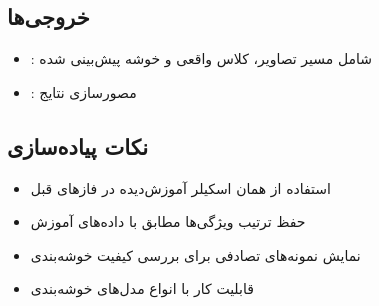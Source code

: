 \documentclass[a4paper,12pt]{article}
\begin{document}
	\subsection{خروجی‌ها}
	\begin{itemize}
		\item {}: شامل مسیر تصاویر، کلاس واقعی و خوشه پیش‌بینی شده
		\item {}: مصورسازی نتایج
	\end{itemize}
	
	\subsection{نکات پیاده‌سازی}
	\begin{itemize}
		\item استفاده از همان اسکیلر آموزش‌دیده در فازهای قبل
		\item حفظ ترتیب ویژگی‌ها مطابق با داده‌های آموزش
		\item نمایش نمونه‌های تصادفی برای بررسی کیفیت خوشه‌بندی
		\item قابلیت کار با انواع مدل‌های خوشه‌بندی
	\end{itemize}
\end{document}

